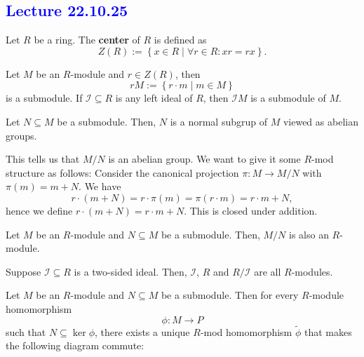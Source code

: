 \subsection{\textcolor{blue}{Lecture 22.10.25}}
\begin{definition}[Center]
    Let $R$ be a ring. The \textbf{center} of $R$ is defined as \[
    Z(R):=\left\{x \in R \mid \forall r \in R: xr = rx \right\} 
    .\] 
\end{definition}
\begin{ex}
    Let $M$ be an $R$-module and $r \in Z(R)$, then \[
    rM := \left\{r \cdot m \mid m \in M\right\}
    \] is a submodule. If $\mathcal{I} \subseteq R$ is any left ideal of $R$, then $\mathcal{I}M$ is a submodule of $M$.
\end{ex}
\begin{prop}
   Let $N \subseteq M$ be a submodule. Then, $N$ is a normal subgrup of $M$ viewed as abelian groups.
\end{prop}
\begin{remark}
    This tells us that $M / N$ is an abelian group. We want to give it some $R$-mod structure as follows: Consider the canonical projection $\pi: M \to M / N$ with $\pi(m)=m+N$. We have \[
    r \cdot (m+N)=r \cdot \pi(m) = \pi(r \cdot m)=r \cdot m + N
    ,\] hence we define $r \cdot (m+N)=r \cdot m +N$. This is closed under addition.
\end{remark}
\begin{prop}
    Let $M$ be an $R$-module and $N \subseteq M$ be a submodule. Then, $M / N$ is also an $R$-module.
\end{prop}
\begin{prop}
    Suppose $\mathcal{I} \subseteq R$ is a two-sided ideal. Then, $\mathcal{I}$, $R$ and $R / \mathcal{I}$ are all $R$-modules.
\end{prop}
\begin{theorem}
   Let $M$ be an $R$-module and $N \subseteq M$ be a submodule. Then for every $R$-module homomorphism \[
   \phi: M \to P
   \]  such that $N \subseteq \ker \phi$, there exists a unique $R$-mod homomorphism $\widetilde{\phi} $ that makes the following diagram commute:
   \begin{figure}[H]
       \centering
\end{figure}
\end{theorem}
